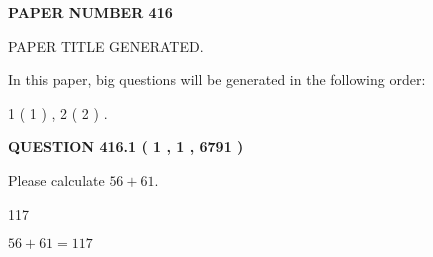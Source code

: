 \documentclass[12pt]{article}
\begin{document}
 
 
   
   
\newpage 
\setcounter{page}{ 
   416001 } 
   
   
   
   
 {\textbf{ \Large{ PAPER NUMBER  416  }}}
   
   
\vspace{0.2in}
   
   
   
   
   
   
   
   
 \vspace{0.2in}
 
 
 
 
   
   
 PAPER TITLE GENERATED.
   
   
   
\vspace{0.2in}
   
In this paper, big questions will be generated in the following order: 
   
   
   1 ( 1 )
 ,
   2 ( 2 )
 .
  
\vspace{0.2in}
  
{\textbf{\Large{QUESTION
416.1 
 ( 1 , 1 , 6791 )
}}}
  
  
 
Please calculate $ %
56 +  %
61 $.
 
 
 
\noindent{}
 
 

117
 
 
\noindent{}
 
 

 
 
 
\noindent{}
 
 

$ %
56 +  %
61=   %
117$
 
 
\noindent{}
 
 

 
   
\end{document}
